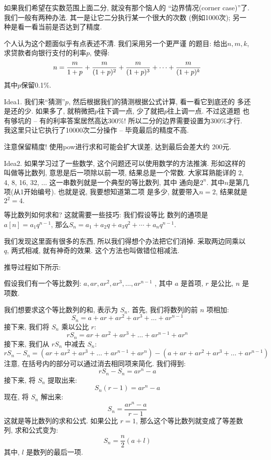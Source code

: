  如果我们希望在实数范围上面二分, 就没有那个恼人的
``边界情况(corner case)''了. 我们一般有两种办法. 其一是让它二分执行某一个很大的次数
(例如1000次); 另一种是看一看当前是否达到了精度. 

 个人认为这个题面似乎有点表述不清. 我们采用另一个更严谨
的题目: 给出$n,m,k$, 求贷款者向银行支付的利率$p$, 使得: 
$$
n={m\over 1+p} +{m\over (1+p)^2}+{m\over (1+p)^3}+\cdots + {m\over (1+p)^k} 
$$
其中$p$保留0.1\%.  

Idea1. 我们来``猜测''$p$, 然后根据我们的猜测根据公式计算, 看一看它到底还的
多还是还的少. 如果多了, 就稍微把$p$往下调一点, 少了就把$p$往上调一点. 不过这道题
也有够坑的 -- 有的利率答案居然高达300\%! 所以二分的边界需要设置为300\%才行. 
我这里只让它执行了10000次二分操作 -- 毕竟最后的精度不高. 

\begin{remark}
    注意保留精度! 使用pow进行求和可能会扩大误差, 达到最后会差大约
    200元. 
\end{remark}

Idea2. 如果学习过了一些数学, 这个问题还可以使用数学的方法推演. 形如这样的
叫做等比数列, 意思是后一项除以前一项, 结果总是一个常数. 大家耳熟能详的
2, 4, 8, 16, 32, $\dots$ 这一串数列就是一个典型的等比数列, 其中
通向是$2^n$. 其中$n$是第几项(从1开始编号). 也就是说, 我要想知道第二项
是多少, 就要带入$n=2$, 结果就是$2^2=4.$ 

 等比数列如何求和? 这就需要一些技巧: 我们假设等比
数列的通项是$a[n]=a_1q^{n-1}$, 
那么$S_n=a_1 + a_2q + a_3 q^2 +\cdots +a_n q^{n-1}$. 

我们发现这里面有很多的东西, 所以我们得想个办法把它们消掉. 采取两边同乘以
$q$, 两式相减, 就有神奇的效果. 这个方法也叫做错位相减法. 

推导过程如下所示: 
\begin{example}
    假设我们有一个等比数列: \(a, ar, ar^2, ar^3, \ldots, ar^{n-1}\) , 其中 \(a\) 是首项,  \(r\) 是公比,  \(n\) 是项数. 

我们想要求这个等比数列的和, 表示为 \(S_n\). 
首先, 我们将数列的前 \(n\) 项相加: 
\[ S_n = a + ar + ar^2 + ar^3 + \ldots + ar^{n-1} \]
接下来, 我们将 \(S_n\) 乘以公比 \(r\): 
\[ rS_n = ar + ar^2 + ar^3 + \ldots + ar^{n-1} + ar^n \]
接下来, 我们从 \(rS_n\) 中减去 \(S_n\): 
\[ rS_n - S_n = (ar + ar^2 + ar^3 + \ldots + ar^{n-1} + ar^n) - (a + ar + ar^2 + ar^3 + \ldots + ar^{n-1}) \]
注意, 在括号内的部分可以通过消去相同项来简化. 我们得到: 
\[ rS_n - S_n = ar^n - a \]
接下来, 将 \(S_n\) 提取出来: 
\[ S_n(r - 1) = ar^n - a \]
现在, 将 \(S_n\) 解出来: 
\[ S_n = \frac{ar^n - a}{r - 1} \]
这就是等比数列的求和公式. 
如果公比 \(r = 1\), 那么这个等比数列就变成了等差数列, 求和公式变为: 
\[ S_n = \frac{n}{2}(a + l) \]
其中,  \(l\) 是数列的最后一项. 
\end{example}


